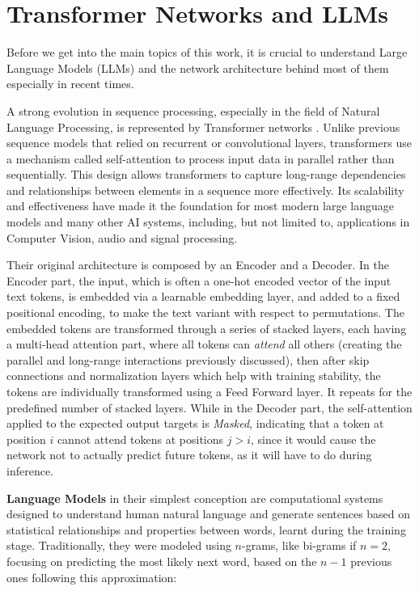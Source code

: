 \documentclass[../thesis.tex]{subfiles}
\begin{document}
\section{Transformer Networks and LLMs}
Before we get into the main topics of this work, it is crucial to understand Large Language Models (LLMs) and the network architecture behind most of them especially in recent times.

A strong evolution in sequence processing, especially in the field of Natural Language Processing,
is represented by Transformer networks \citep{NIPS2017_attentionisallyouneed}.
Unlike previous sequence models that relied on recurrent or convolutional layers, transformers use a mechanism called self-attention to process input data in parallel rather than sequentially. This design allows transformers to capture long-range dependencies and relationships between elements in a sequence more effectively. Its scalability and effectiveness have made it the foundation for most modern large language models and many other AI systems, including, but not limited to, applications in Computer Vision, audio and signal processing.

Their original architecture is composed by an Encoder and a Decoder.
In the Encoder part, the input, which is often a one-hot encoded vector of the input text tokens, is embedded via a learnable embedding layer, and added to a fixed positional encoding, to make the text variant with respect to permutations.
The embedded tokens are transformed through a series of stacked layers, each having a multi-head attention part, where all tokens can \emph{attend} all others (creating the parallel and long-range interactions previously discussed), then after skip connections and normalization layers which help with training stability, the tokens are individually transformed using a Feed Forward layer. It repeats for the predefined number of stacked layers.
While in the Decoder part, the self-attention applied to the expected output targets is \emph{Masked}, indicating that a token at position $i$ cannot attend tokens at positions $j > i$, since it would cause the network not to actually predict future tokens, as it will have to do during inference.

\textbf{Language Models} in their simplest conception are computational systems designed to understand human natural language and generate sentences based on statistical relationships and properties between words, learnt during the training stage.
Traditionally, they were modeled using $n$-grams, like bi-grams if $n = 2$, focusing on predicting the most likely next word, based on the $n-1$ previous ones following this approximation:
\end{document}
